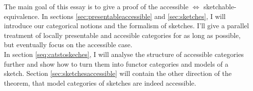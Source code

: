 The main goal of this essay is to give a proof of the accessible $\Leftrightarrow$ sketchable-equivalence. In sections \ref{sec:presentableaccessible} and \ref{sec:sketches}, I will introduce our categorical notions and the formalism of sketches. I'll give a parallel treatment of locally presentable and accesible categories for as long as possible, but eventually focus on the accessible case. \\

In section \ref{seq:catstoskeches}, I will analyse the structure of accessible categories further and show how to turn them into functor categories and models of a sketch. Section \ref{sec:sketchesaccessible} will contain the other direction of the theorem, that model categories of sketches are indeed accessible.
